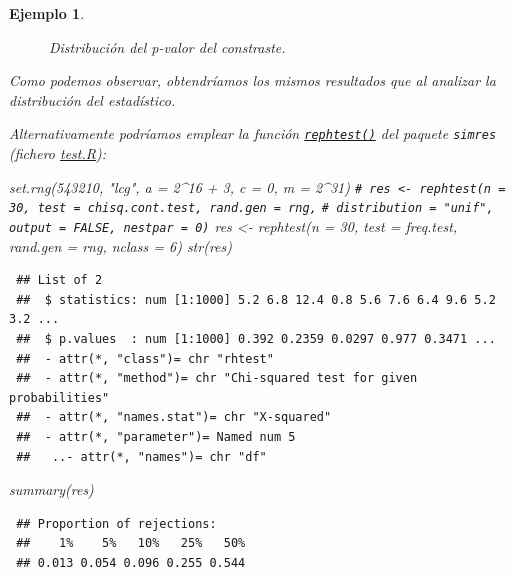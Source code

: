 \documentclass[
]{book}
\newenvironment{Shaded}{\begin{snugshade}}{\end{snugshade}}
\newcommand{\AttributeTok}[1]{\textcolor[rgb]{0.77,0.63,0.00}{#1}}
\newcommand{\CommentTok}[1]{\textcolor[rgb]{0.56,0.35,0.01}{\textit{#1}}}
\newcommand{\DecValTok}[1]{\textcolor[rgb]{0.00,0.00,0.81}{#1}}
\newcommand{\FunctionTok}[1]{\textcolor[rgb]{0.00,0.00,0.00}{#1}}
\newcommand{\NormalTok}[1]{#1}
\newcommand{\OtherTok}[1]{\textcolor[rgb]{0.56,0.35,0.01}{#1}}
\newcommand{\SpecialCharTok}[1]{\textcolor[rgb]{0.00,0.00,0.00}{#1}}
\newcommand{\StringTok}[1]{\textcolor[rgb]{0.31,0.60,0.02}{#1}}
\theoremstyle{break}
\newtheorem{example}{Ejemplo}[chapter]
\theoremstyle{nonumberplain}
\renewcommand{\CommentTok}[1]{\textcolor[rgb]{0.41,0.41,0.41}{\texttt{#1}}}
\begin{document}
\begin{example}
\begin{figure}[!htb]
{}

\caption{Distribución del p-valor del constraste.}\label{fig:rep-test-pval}
\end{figure}

Como podemos observar, obtendríamos los mismos resultados que al analizar la distribución del estadístico.

Alternativamente podríamos emplear la función \href{https://rubenfcasal.github.io/simres/reference/rephtest.html}{\texttt{rephtest()}} del paquete \texttt{simres} (fichero \href{R/test.R}{\emph{test.R}}):

\begin{Shaded}
\begin{Highlighting}[]
\FunctionTok{set.rng}\NormalTok{(}\DecValTok{543210}\NormalTok{, }\StringTok{"lcg"}\NormalTok{, }\AttributeTok{a =} \DecValTok{2}\SpecialCharTok{\^{}}\DecValTok{16} \SpecialCharTok{+} \DecValTok{3}\NormalTok{, }\AttributeTok{c =} \DecValTok{0}\NormalTok{, }\AttributeTok{m =} \DecValTok{2}\SpecialCharTok{\^{}}\DecValTok{31}\NormalTok{)}
\CommentTok{\# res \textless{}{-} rephtest(n = 30, test = chisq.cont.test, rand.gen = rng,}
\CommentTok{\#          distribution = "unif", output = FALSE, nestpar = 0)}
\NormalTok{res }\OtherTok{\textless{}{-}} \FunctionTok{rephtest}\NormalTok{(}\AttributeTok{n =} \DecValTok{30}\NormalTok{, }\AttributeTok{test =}\NormalTok{ freq.test, }\AttributeTok{rand.gen =}\NormalTok{ rng, }\AttributeTok{nclass =} \DecValTok{6}\NormalTok{)}
\FunctionTok{str}\NormalTok{(res)}
\end{Highlighting}
\end{Shaded}

\begin{verbatim}
 ## List of 2
 ##  $ statistics: num [1:1000] 5.2 6.8 12.4 0.8 5.6 7.6 6.4 9.6 5.2 3.2 ...
 ##  $ p.values  : num [1:1000] 0.392 0.2359 0.0297 0.977 0.3471 ...
 ##  - attr(*, "class")= chr "rhtest"
 ##  - attr(*, "method")= chr "Chi-squared test for given probabilities"
 ##  - attr(*, "names.stat")= chr "X-squared"
 ##  - attr(*, "parameter")= Named num 5
 ##   ..- attr(*, "names")= chr "df"
\end{verbatim}

\begin{Shaded}
\begin{Highlighting}[]
\FunctionTok{summary}\NormalTok{(res)}
\end{Highlighting}
\end{Shaded}

\begin{verbatim}
 ## Proportion of rejections:
 ##    1%    5%   10%   25%   50% 
 ## 0.013 0.054 0.096 0.255 0.544
\end{verbatim}


\end{example}
\end{document}
